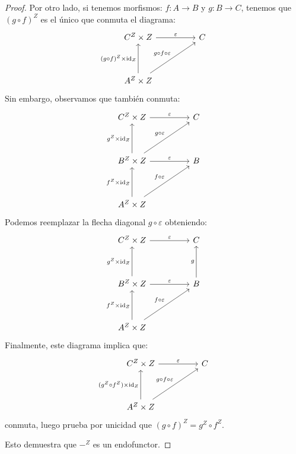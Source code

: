 \documentclass[12pt, twoside]{book}
\newcommand{\cat}{{\mathcal{C}}}
\newcommand{\Cat}{{Cat}}
\DeclareMathOperator{\id}{id}
\begin{document}
\begin{proof}
Por otro lado, si tenemos morfismos: $f \colon A \to B$ y $g \colon B \to C$, tenemos que $(g \circ f)^Z$ es el único que conmuta el diagrama:
\[
\begin{tikzcd}
C^Z \times Z \arrow[rr,"\varepsilon"] & & C \\\\
A^Z \times Z \arrow[uu,"(g \circ f)^Z \times\id_Z"]  \arrow[uurr,"g \circ f \circ \varepsilon"]
\end{tikzcd}
\]
Sin embargo, observamos que también conmuta:
\[
\begin{tikzcd}
C^Z \times Z \arrow[rr,"\varepsilon"] & & C\\\\
B^Z \times Z \arrow[rr,"\varepsilon"] \arrow[uu,"g^Z \times \id_Z"] \arrow[uurr,"g \circ \varepsilon"] & & B \\\\
A^Z \times Z \arrow[uu,"f^Z \times\id_Z"]  \arrow[uurr,"f \circ \varepsilon"]
\end{tikzcd}
\]
Podemos reemplazar la flecha diagonal $g \circ \varepsilon$ obteniendo:
\[
\begin{tikzcd}
C^Z \times Z \arrow[rr,"\varepsilon"] & & C\\\\
B^Z \times Z \arrow[rr,"\varepsilon"] \arrow[uu,"g^Z \times \id_Z"] & & B \arrow[uu,"g"] \\\\
A^Z \times Z \arrow[uu,"f^Z \times\id_Z"]  \arrow[uurr,"f \circ \varepsilon"]
\end{tikzcd}
\]
Finalmente, este diagrama implica que:
\[
\begin{tikzcd}
C^Z \times Z \arrow[rr,"\varepsilon"] & & C\\\\
A^Z \times Z \arrow[uu,"(g^Z \circ f^Z) \times\id_Z"]  \arrow[uurr,"g \circ f \circ \varepsilon"]
\end{tikzcd}
\]
conmuta, luego prueba por unicidad que $(g \circ f)^Z = g^Z \circ f^Z$.

Esto demuestra que $-^Z$ es un endofunctor.
\end{proof}


\end{document}
